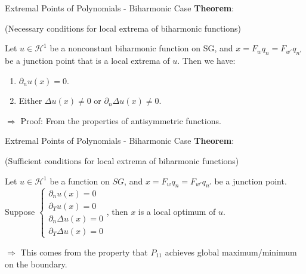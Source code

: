 \documentclass[xcolor = dvipsnames]{beamer}
\newcommand{\lap}{\Delta}
\begin{document}
\begin{frame}{Extremal Points of Polynomials - Biharmonic Case}
    \textbf{Theorem}:
    
    (Necessary conditions for local extrema of biharmonic functions)
    
    \vspace{10pt}
    
    Let $u\in\mathcal{H}^{1}$ be a nonconstant biharmonic function on SG, and $x=F_{w}q_{n}=F_{w'}q_{n'}$ be a junction point that is a local extrema of $u$. Then we have:
    
    \begin{enumerate}
        \item $\partial_{n}u(x)=0$.
        \item Either $\lap u(x)\neq 0$ or $\partial_{n}\lap u(x)\neq 0$.
    \end{enumerate}
    
    $\Rightarrow$ Proof: From the properties of antisymmetric functions.
\end{frame}

\begin{frame}{Extremal Points of Polynomials - Biharmonic Case}
    \textbf{Theorem}:
    
    (Sufficient conditions for local extrema of biharmonic functions)
    
    \vspace{10pt}
    
    Let $u\in\mathcal{H}^{1}$ be a function on $SG$, and $x=F_{w}q_{n}=F_{w'}q_{n'}$ be a junction point. Suppose $\begin{cases}
    \partial_{n}u(x) = 0 \\
    \partial_{T}u(x) = 0 \\
    \partial_{n}\lap u(x) = 0 \\
    \partial_{T}\lap u(x) = 0
\end{cases}$, then $x$ is a local optimum of $u$.

\vspace{10pt}

$\Rightarrow$ This comes from the property that $P_{11}$ achieves global maximum/minimum on the boundary.
\end{frame}
\end{document}
